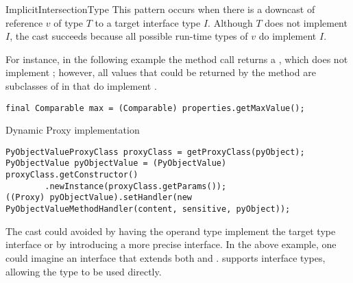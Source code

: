 \begin{pattern}{ImplicitIntersectionType}
This pattern occurs when there is a downcast of reference $v$ of type $T$ to a
target
interface type $I$.
Although $T$ does not implement $I$, 
the cast succeeds because all possible run-time types of $v$
do implement $I$.

\instances{}
For instance, in the following example%
\def\urlvar{http://bit.ly/senbox_org_snap_desktop_2FQOt4v}
the method call returns a , which does not implement
; however,
all values that could be returned by the method
are subclasses of  in 
that do implement .

\begin{verbatim}
final Comparable max = (Comparable) properties.getMaxValue();
\end{verbatim}

Dynamic Proxy implementation
\def\urlvar{http://bit.ly/CloudSlang_cloud_slang_2EkgP4l}

\begin{verbatim}
PyObjectValueProxyClass proxyClass = getProxyClass(pyObject);
PyObjectValue pyObjectValue = (PyObjectValue) proxyClass.getConstructor()
        .newInstance(proxyClass.getParams());
((Proxy) pyObjectValue).setHandler(new PyObjectValueMethodHandler(content, sensitive, pyObject));
\end{verbatim}

\discussion{}
The cast could avoided by having the operand type implement the target type
  interface or by introducing a more precise interface.
  In the above example, one could imagine an interface
   that extends both  and
  . \scala{} supports
  interface types, allowing 
  the type 
  to be used directly.

\end{pattern}